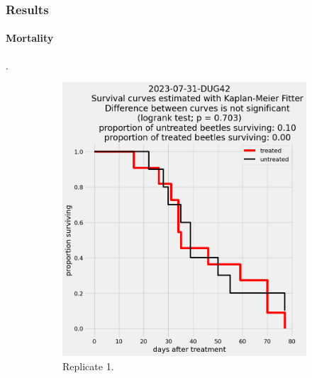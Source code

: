 \documentclass[12pt,letterpaper,english,bibliography=totocnumbered, abstract=on]{scrartcl}
\begin{document}
\subsubsection{Results}

\paragraph{Mortality}.


\begin{figure}[h]
	\centering
	\begin{subfigure}{.3\textwidth}
		\includegraphics[width=\linewidth]{images/survival_curves/2023-07-31-DUG42}
		\caption{Replicate 1.}
	\end{subfigure}
	\begin{subfigure}{.3\textwidth}

\end{subfigure}
\end{figure}
\end{document}
